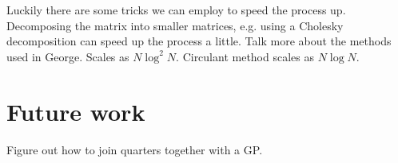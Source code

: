 \documentclass[12pt,preprint]{aastex}
\begin{document}
Luckily there are some tricks we can employ to speed the process up. %
Decomposing the matrix into smaller matrices, e.g. using a Cholesky decomposition can speed up the process a little.
Talk more about the methods used in George.
Scales as $N\log^2{N}$.
Circulant method scales as $N\log{N}$.

\section{Future work}

Figure out how to join quarters together with a GP.
\end{document}
